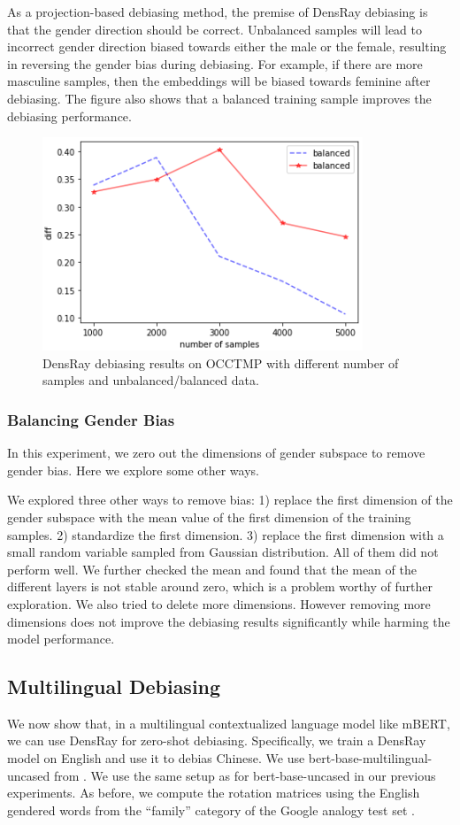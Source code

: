 As a projection-based debiasing method, the premise of DensRay debiasing is that the gender direction should be correct. Unbalanced samples will lead to incorrect gender direction biased towards either the male or the female, resulting in reversing the gender bias during debiasing. For example, if there are more masculine samples, then the embeddings will be biased towards feminine after debiasing. The figure also shows that a balanced training sample improves the debiasing performance.
\begin{figure}[h]
	\centering
	\includegraphics[width=0.5\linewidth]{samples}
	\caption{DensRay debiasing results on OCCTMP with different number of samples and unbalanced/balanced data.}
\end{figure}

\subsubsection{Balancing Gender Bias}
In this experiment, we zero out the dimensions of gender subspace to remove gender bias. Here we explore some other ways.

We explored three other ways to remove bias: 1) replace the first dimension of the gender subspace with the mean value of the first dimension of the training samples. 2) standardize the first dimension. 3) replace the first dimension with a small random variable sampled from Gaussian distribution. All of them did not perform well. We further checked the mean and found that the mean of the different layers is not stable around zero, which is a problem worthy of further exploration. We also tried to delete more dimensions. However removing more dimensions does not improve the debiasing results significantly while harming the model performance.


\subsection{Multilingual Debiasing}
We now show that, in a multilingual contextualized language model like mBERT, we can use DensRay for zero-shot debiasing. Specifically, we train a DensRay model on English and use it to debias Chinese.
We use  bert-base-multilingual-uncased from . We use the same setup as for bert-base-uncased in our previous experiments. As before, we compute the rotation matrices using the English gendered words from the ``family'' category of the Google analogy test set .

